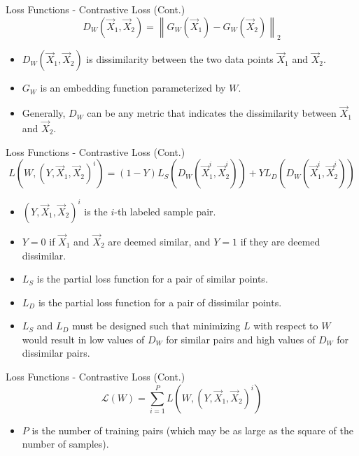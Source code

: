 \documentclass[serif, aspectratio=169]{beamer}
\begin{document}
\begin{frame}{Loss Functions - Contrastive Loss (Cont.)}
\begin{equation*}
D_W\left(\vec{X}_1, \vec{X}_2\right)=\left\|G_W\left(\vec{X}_1\right)-G_W\left(\vec{X}_2\right)\right\|_2
\end{equation*}

    \begin{itemize}
        \item $D_W\left(\vec{X}_1, \vec{X}_2\right)$ is dissimilarity between the two data points $\vec{X}_1$ and $\vec{X}_2$.
        \item $G_W$ is an embedding function parameterized by $W$.
        \item Generally, $D_W$ can be any metric that indicates the dissimilarity between $\vec{X}_1$ and $\vec{X}_2$.
    \end{itemize}
\end{frame}


\begin{frame}{Loss Functions - Contrastive Loss (Cont.)}
\begin{equation*}
L\left(W,\left(Y, \vec{X}_1, \vec{X}_2\right)^i\right)=(1-Y)
L_S\left(D_W(\vec{X}_1^i, \vec{X}_2^i)\right)+
Y L_D\left(D_W(\vec{X}_1^i, \vec{X}_2^i)\right)
\end{equation*}

    \begin{itemize}
        \item $\left(Y, \vec{X}_1, \vec{X}_2\right)^i$ is the $i$-th labeled sample pair.
        \item $Y=0$ if $\vec{X}_1$ and $\vec{X}_2$ are deemed similar, and $Y=1$ if they are deemed dissimilar.
        \item $L_S$ is the partial loss function for a pair of similar points.
        \item $L_D$ is the partial loss function for a pair of dissimilar points.
        \item $L_S$ and $L_D$ must be designed such that minimizing $L$ with respect to $W$ would result in low values of $D_W$ for similar pairs and high values of $D_W$ for dissimilar pairs.
    \end{itemize}
\end{frame}


\begin{frame}{Loss Functions - Contrastive Loss (Cont.)}
\begin{equation*}
\mathcal{L}(W)=\sum_{i=1}^P L\left(W,\left(Y, \vec{X}_1, \vec{X}_2\right)^i\right)
\end{equation*}

    \begin{itemize}
        \item $P$ is the number of training pairs (which may be as large as the
square of the number of samples).
    \end{itemize}
\end{frame}
\end{document}
